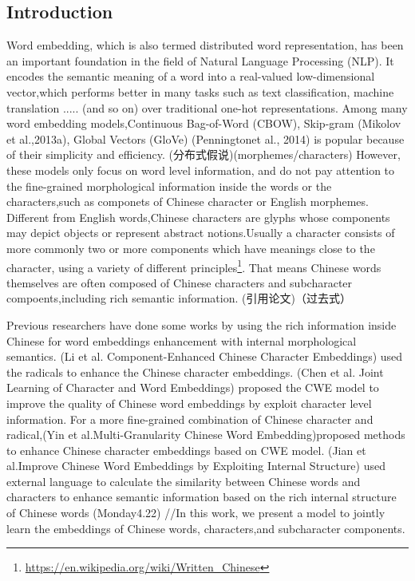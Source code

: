 \documentclass[runningheads]{llncs}
\begin{document}
\begin{CJK}{UTF8}{gkai} 
\section{Introduction}
Word embedding, which is also termed distributed word representation, has been an important foundation in the field of Natural Language Processing (NLP)\cite{GWE}.
It encodes the semantic meaning of a word into a real-valued low-dimensional vector,which performs better in many tasks such as text classification, machine translation ..... (and so on) over traditional one-hot representations.
Among many word embedding models,Continuous Bag-of-Word (CBOW), Skip-gram (Mikolov et al.,2013a), Global Vectors (GloVe) (Penningtonet al., 2014) is popular because of their simplicity and efficiency.
(分布式假说)(morphemes/characters)
However, these models only focus on word level information, and do not pay attention to the fine-grained morphological information inside the words or the characters,such as componets of Chinese character or English
morphemes.
    Different from English words,Chinese characters are glyphs whose components may depict objects or represent abstract notions.Usually a character consists of more commonly two or more components 
which have meanings close to the character, using a variety of different principles\footnote[1]{\url{https://en.wikipedia.org/wiki/Written_Chinese}}.
That means Chinese words themselves are often composed of Chinese characters and subcharacter compoents,including rich semantic information.
    (引用论文)（过去式）

  Previous researchers have done some works by using the rich information inside Chinese for word embeddings enhancement with internal morphological semantics.
   (Li et al.  Component-Enhanced Chinese Character Embeddings) used the radicals to enhance the Chinese character embeddings.
(Chen et al. Joint Learning of Character and Word Embeddings) proposed the CWE model to improve the quality of Chinese word embeddings by exploit character level information.   
For a more fine-grained combination of Chinese character and radical,(Yin et al.Multi-Granularity Chinese Word Embedding)proposed methods to enhance Chinese character embeddings based on CWE model.
   (Jian et al.Improve Chinese Word Embeddings by Exploiting Internal Structure) used external language to calculate the similarity between Chinese words and characters to enhance semantic information
  based on the rich internal structure of Chinese words
(Monday4.22)
//In this work, we present a model to jointly learn the embeddings of Chinese words, characters,and subcharacter components.


\end{CJK}
\end{document}

